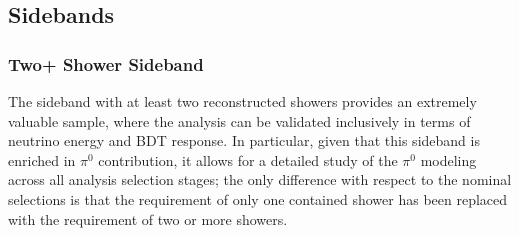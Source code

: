 \subsection{\npsel Sidebands}
\label{sec:sideband:1eNp}
\subsubsection{Two+ Shower Sideband}
\label{sec:sideband:1eNp:2pshr}
The sideband with at least two reconstructed showers provides an extremely valuable sample, where the analysis can be validated inclusively in terms of neutrino energy and BDT response. In particular, given that this sideband is enriched in $\pi^0$ contribution, it allows for a detailed study of the $\pi^0$ modeling across all analysis selection stages; the only difference with respect to the nominal selections is that the requirement of only one contained shower has been replaced with the requirement of two or more showers.


